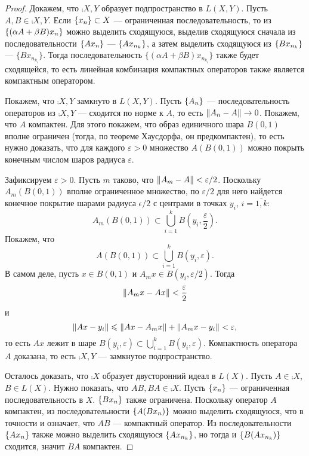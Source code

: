 \begin{proof}
    Докажем, что $\comp{X,Y}$ образует подпространство в $L(X, Y)$. Пусть $A, B \in \comp{X, Y}$.
    Если $\left\{x_n\right\} \subset X$ --- ограниченная последовательность, то из
    $\left\{(\alpha A + \beta B)x_n\right\}$ можно выделить сходящуюся,
    выделив сходящуюся сначала из последовательности $\left\{Ax_n\right\}$ --- $\left\{Ax_{n_k}\right\}$, а 
    затем выделить сходящуюся из $\left\{Bx_{n_k}\right\}$ --- $\{Bx_{n_{k_i}}\}$. Тогда 
    последовательность
    $\{(\alpha A + \beta B)x_{n_{k_i}}\}$ также будет сходящейся, то есть линейная комбинация
    компактных операторов также является компактным оператором.

    Покажем, что $\comp{X,Y}$ замкнуто в $L(X,Y)$. Пусть $\left\{A_n\right\}$ --- последовательность 
    операторов из $\comp{X,Y}$ --- сходится
    по норме к $A$, то есть $\left\|A_n - A\right\| \to 0$. Покажем, что $A$ компактен. Для этого покажем,
    что образ единичного шара $B(0,1)$ вполне ограничен (тогда, по теореме Хаусдорфа, он
    предкомпактен), то есть нужно доказать, что для каждого $\varepsilon > 0$ множество $A(B(0,1))$
    можно покрыть конечным числом шаров радиуса $\varepsilon$.

    Зафиксируем $\varepsilon > 0$. Пусть $m$ таково, что $\left\|A_m - A\right\| < \varepsilon/2$.
    Поскольку $A_m(B(0,1))$ вполне ограниченное множество, по $\varepsilon/2$ для него найдется 
    конечное покрытие шарами радиуса $\epsilon/2$ с центрами в точках $y_i$, $i = \overline{1,k}$:
    \[ A_m(B(0,1)) \subset \bigcup_{i=1}^k B(y_i, \frac{\varepsilon}{2}). \]
    Покажем, что 
    \[ A(B(0,1)) \subset \bigcup_{i=1}^k B(y_i, \varepsilon). \]
    В самом деле, пусть $x \in B(0, 1)$ и $A_mx \in B(y_i, \varepsilon/2)$. Тогда
    \[ \left\|A_mx - Ax\right\| < \frac{\varepsilon}{2} \]
    и
    \[ \left\|Ax - y_i\right\| \leqslant \left\|Ax - A_mx\right\| + \left\|A_mx - y_i\right\| < \varepsilon, \]
    то есть $Ax$ лежит в шаре $B(y_i, \varepsilon) \subset \bigcup_{i=1}^k B(y_i, \varepsilon)$.
    Компактность оператора $A$ доказана, то есть $\comp{X,Y}$ --- замкнутое подпространство.

    Осталось доказать, что $\comp{X}$ образует двусторонний идеал в $L(X)$. Пусть $A \in \comp{X}$,
    $B \in L(X)$. Нужно показать, что $AB, BA \in \comp{X}$. Пусть $\left\{x_n\right\}$ --- ограниченная
    последовательность в $X$. $\left\{Bx_n\right\}$ также ограничена. Поскольку оператор $A$ компактен,
    из последовательности $\left\{A(Bx_n)\right\}$ можно выделить сходящуюся, что в точности и означает,
    что $AB$ --- компактный оператор. Из последовательности $\left\{Ax_n\right\}$ также можно выделить сходящуюся
    $\left\{Ax_{n_k}\right\}$, но тогда и $\left\{B(Ax_{n_k})\right\}$ сходится, значит $BA$
    компактен.
\end{proof}

